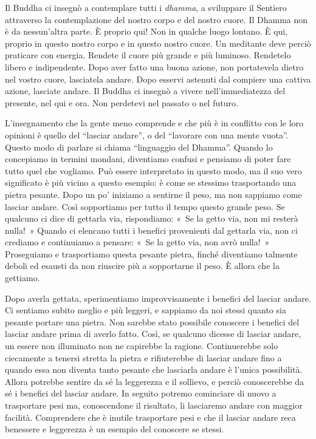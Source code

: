 Il Buddha ci insegnò a contemplare tutti i \emph{dhamma}, a sviluppare
il Sentiero attraverso la contemplazione del nostro corpo e del nostro
cuore. Il Dhamma non è da nessun'altra parte. È proprio qui! Non in
qualche luogo lontano. È qui, proprio in questo nostro corpo e in questo
nostro cuore. Un meditante deve perciò praticare con energia. Rendete il
cuore più grande e più luminoso. Rendetelo libero e indipendente. Dopo
aver fatto una buona azione, non portatevela dietro nel vostro cuore,
lasciatela andare. Dopo esservi astenuti dal compiere una cattiva
azione, lasciate andare. Il Buddha ci insegnò a vivere nell'immediatezza
del presente, nel qui e ora. Non perdetevi nel passato o nel futuro.

L'insegnamento che la gente meno comprende e che più è in conflitto con
le loro opinioni è quello del ``lasciar andare'', o del ``lavorare con
una mente vuota''. Questo modo di parlare si chiama ``linguaggio del
Dhamma''. Quando lo concepiamo in termini mondani, diventiamo confusi e
pensiamo di poter fare tutto quel che vogliamo. Può essere interpretato
in questo modo, ma il suo vero significato è più vicino a questo
esempio: è come se stessimo trasportando una pietra pesante. Dopo un po'
iniziamo a sentirne il peso, ma non sappiamo come lasciar andare. Così
sopportiamo per tutto il tempo questo grande peso. Se qualcuno ci dice
di gettarla via, rispondiamo: «~Se la getto via, non mi resterà nulla!~»
Quando ci elencano tutti i benefici provenienti dal gettarla via, non ci
crediamo e continuiamo a pensare: «~Se la getto via, non avrò nulla!~»
Proseguiamo e trasportiamo questa pesante pietra, finché diventiamo
talmente deboli ed esausti da non riuscire più a sopportarne il peso. È
allora che la gettiamo.

Dopo averla gettata, sperimentiamo improvvisamente i benefici del
lasciar andare. Ci sentiamo subito meglio e più leggeri, e sappiamo da
noi stessi quanto sia pesante portare una pietra. Non sarebbe stato
possibile conoscere i benefici del lasciar andare prima di averlo fatto.
Così, se qualcuno dicesse di lasciar andare, un essere non illuminato
non ne capirebbe la ragione. Continuerebbe solo ciecamente a tenersi
stretta la pietra e rifiuterebbe di lasciar andare fino a quando essa
non diventa tanto pesante che lasciarla andare è l'unica possibilità.
Allora potrebbe sentire da sé la leggerezza e il sollievo, e perciò
conoscerebbe da sé i benefici del lasciar andare. In seguito potremo
cominciare di nuovo a trasportare pesi ma, conoscendone il risultato, li
lasciaremo andare con maggior facilità. Comprendere che è inutile
trasportare pesi e che il lasciar andare reca benessere e leggerezza è
un esempio del conoscere se stessi.


